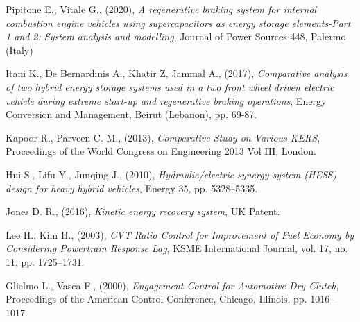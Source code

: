 \documentclass[11pt]{article}
\begin{document}
\begin{thebibliography}{60}
	Pipitone E., Vitale G., (2020), \textit{A regenerative braking system for 			internal combustion engine vehicles using supercapacitors as energy storage 		elements-Part 1 and 2: System analysis and modelling}, Journal of Power 			Sources 448, Palermo (Italy)     	
	
	Itani K., De Bernardinis A., Khatir Z, Jammal A., (2017),  							\textit{Comparative analysis of two hybrid energy storage systems used in a 		two front wheel driven electric vehicle during extreme start-up and 				regenerative braking operations},  Energy Conversion and Management, Beirut 		(Lebanon), pp. 69-87.
	
	Kapoor R., Parveen C. M., (2013), \textit{Comparative Study on Various KERS},   	Proceedings of the World Congress on Engineering 2013 Vol III, London.
	
	Hui S., Lifu Y., Junqing J., (2010), \textit{Hydraulic/electric synergy   	 	    system (HESS) design for heavy hybrid vehicles}, Energy 35, pp. 5328--5335.
	
	Jones D. R., (2016), \textit{Kinetic energy recovery system},
	UK Patent.  
	
	Lee H., Kim H., (2003), \textit{CVT Ratio Control for Improvement of Fuel Economy
	by Considering Powertrain Response Lag}, KSME International Journal, vol. 17, no. 11, pp. 1725--1731. 
	
	Glielmo L., Vasca F., (2000), \textit{Engagement Control for Automotive Dry Clutch}, Proceedings of the American Control Conference, Chicago, Illinois, pp. 1016--1017.
	
	
\end{thebibliography}
\end{document}
